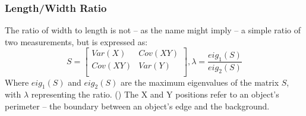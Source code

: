 \documentclass[letterpaper]{report}
\begin{document}
{%

\subsubsection{Length/Width Ratio}
\label{sec:length-width-ratio}
The ratio of width to length is not -- as the name might imply -- a simple ratio of two measurements, but is expressed as:
\begin{equation}
S = 
	\begin{bmatrix}
	Var(X) & Cov(XY) \\[0.3em]
	Cov(XY) & Var(Y) \\[0.3em]
	\end{bmatrix},
\lambda = \frac {eig_{1}(S)} {eig_{2}(S)}
\end{equation}
Where $eig_{1}(S)$ and $eig_{2}(S)$ are the maximum eigenvalues of the matrix $S$, with $\lambda$ representing the ratio. (\cite{Lin2017-xq}) The X and Y positions refer to an object's perimeter -- the boundary between an object's edge and the background.



}
\end{document}
